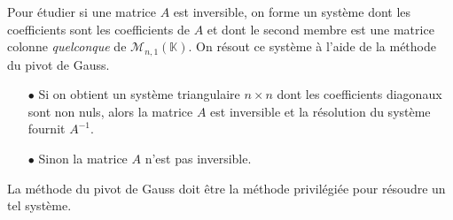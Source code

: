 \documentclass[a4paper,10pt]{report}
\begin{document}
\begin{metho}
Pour étudier si une matrice $A$ est inversible, on forme un système dont les coefficients sont les coefficients de $A$ et dont le second membre est une matrice colonne \emph{quelconque} de $\mathcal{M}_{n,1}(\mathbb{K}).$ On résout ce système à l'aide de la méthode du pivot de Gauss. 
 \begin{enumerate}
  \item[$\bullet$]   Si on obtient un système triangulaire $n \times n$ dont les coefficients diagonaux sont non nuls, alors la matrice $A$ est inversible et la résolution du système fournit $A^{-1}$.
  \item[$\bullet$] Sinon la matrice $A$ n'est pas inversible. 
 \end{enumerate}
\end{metho}

\begin{Remarque}{} La méthode du pivot de Gauss doit être la méthode privilégiée pour résoudre un tel système. 
\end{Remarque}
\end{document}

